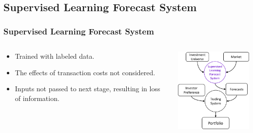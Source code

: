 \subsection{Supervised Learning Forecast System}
\begin{frame}
\frametitle{Supervised Learning Forecast System}
\begin{columns}
\begin{column}{0.55\textwidth}
\begin{itemize}
\item
Trained with labeled data.
\item The effects of transaction costs not considered.
\item
\alert{Inputs not passed to next stage, resulting in loss of information.}
\end{itemize}
\end{column}
\begin{column}{0.45\textwidth}
\begin{center}
\includegraphics[width=4.8cm]{images/supervised_learning.png}
\end{center}
\end{column}
\end{columns}
\end{frame}


